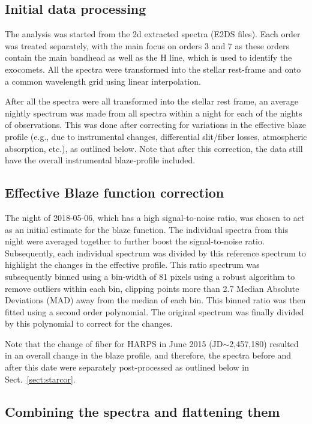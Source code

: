 \documentclass{aa}
\begin{document}
\subsection{Initial data processing}
The analysis was started from the 2d extracted spectra (E2DS files).
%
Each order was treated separately, with the main focus on orders 3 and 7 as these orders contain the main  bandhead as well as the  H line, which is used to identify the exocomets.
%
All the spectra were transformed into the stellar rest-frame and onto a common wavelength grid using linear interpolation.

After all the spectra were all transformed into the stellar rest frame, an average nightly spectrum was made from all spectra within a night for each of the nights of observations. This was done after correcting for variations in the effective blaze profile (e.g., due to instrumental changes, differential slit/fiber losses, atmospheric absorption, etc.), as outlined below. Note that after this correction, the data still have the overall instrumental blaze-profile included.

\subsection{Effective Blaze function correction}\label{sect:blaze}

The night of 2018-05-06, which has a high signal-to-noise ratio, was chosen to act as an initial estimate for the blaze function.
%
The individual spectra from this night were averaged together to further boost the signal-to-noise ratio.
%
Subsequently, each individual spectrum was divided by this reference spectrum to highlight the changes in the effective profile.
%
This ratio spectrum was subsequently binned using a bin-width of 81 pixels using a robust algorithm to remove outliers within each bin, clipping points more than 2.7 Median Absolute Deviations (MAD) away from the median of each bin.
%
This binned ratio was then fitted using a second order polynomial.
%
The original spectrum was finally divided by this polynomial to correct for the changes.

Note that the change of fiber for HARPS in June 2015 (JD$\sim$2,457,180) resulted in an overall change in the blaze profile, and therefore, the spectra before and after this date were separately post-processed as outlined below in Sect.~\ref{sect:starcor}.

\subsection{Combining the spectra and flattening them}\label{sect:comb}
\end{document}
